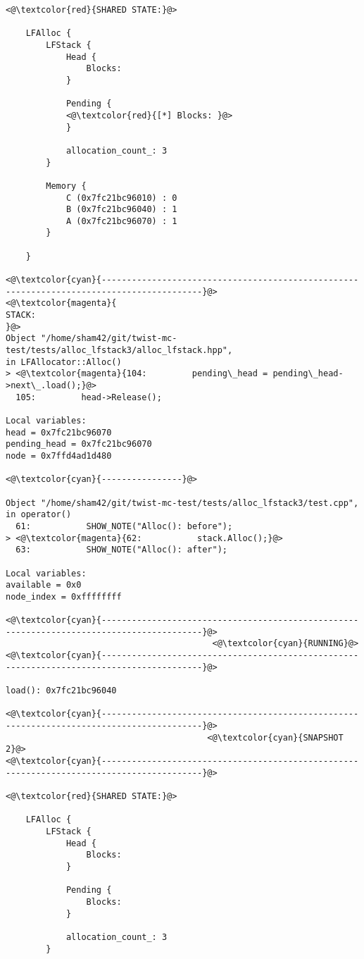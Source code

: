 \begin{adjustwidth}{-3.3cm}{-1cm}
\begin{allintypewriter}
\begin{multicols*}{2}
\begin{lstlisting}[numbers=none]
<@\textcolor{red}{SHARED STATE:}@>

    LFAlloc {
	    LFStack {
		    Head {
			    Blocks: 
		    }

		    Pending {
			<@\textcolor{red}{[*] Blocks: }@>
		    }

		    allocation_count_: 3
	    }

	    Memory {
		    C (0x7fc21bc96010) : 0
		    B (0x7fc21bc96040) : 1
		    A (0x7fc21bc96070) : 1
	    }

    }

<@\textcolor{cyan}{------------------------------------------------------------------------------------------}@>
<@\textcolor{magenta}{
STACK:
}@>
Object "/home/sham42/git/twist-mc-test/tests/alloc_lfstack3/alloc_lfstack.hpp",
in LFAllocator::Alloc()
> <@\textcolor{magenta}{104:         pending\_head = pending\_head->next\_.load();}@>
  105:         head->Release();

Local variables: 
head = 0x7fc21bc96070
pending_head = 0x7fc21bc96070
node = 0x7ffd4ad1d480

<@\textcolor{cyan}{----------------}@>

Object "/home/sham42/git/twist-mc-test/tests/alloc_lfstack3/test.cpp",
in operator()
  61:           SHOW_NOTE("Alloc(): before");
> <@\textcolor{magenta}{62:           stack.Alloc();}@>
  63:           SHOW_NOTE("Alloc(): after");

Local variables: 
available = 0x0
node_index = 0xffffffff

<@\textcolor{cyan}{------------------------------------------------------------------------------------------}@>
                                         <@\textcolor{cyan}{RUNNING}@>
<@\textcolor{cyan}{------------------------------------------------------------------------------------------}@>

load(): 0x7fc21bc96040

<@\textcolor{cyan}{------------------------------------------------------------------------------------------}@>
                                        <@\textcolor{cyan}{SNAPSHOT 2}@>
<@\textcolor{cyan}{------------------------------------------------------------------------------------------}@>

<@\textcolor{red}{SHARED STATE:}@>

    LFAlloc {
	    LFStack {
		    Head {
			    Blocks: 
		    }

		    Pending {
			    Blocks: 
		    }

		    allocation_count_: 3
	    }


\end{lstlisting}
\end{multicols*}
\end{allintypewriter}
\end{adjustwidth}
